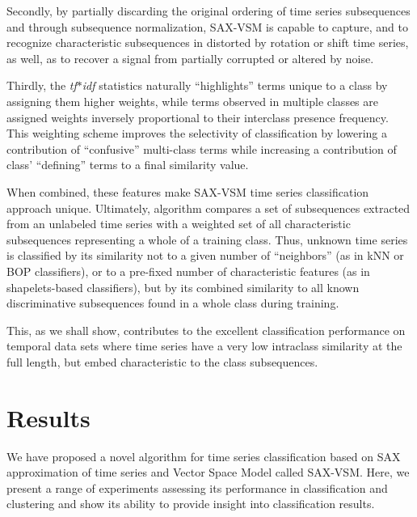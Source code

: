 Secondly, by partially discarding the original ordering of time series subsequences and
through subsequence normalization, SAX-VSM is capable to capture, and to recognize 
characteristic subsequences in distorted by rotation or shift time series, as well,
as to recover a signal from partially corrupted or altered by noise. 

Thirdly, the \textit{tf$\ast$idf} statistics naturally ``highlights'' terms unique to a
class by assigning them higher weights, while terms observed in multiple classes are 
assigned weights inversely proportional to their interclass presence frequency. 
This weighting scheme improves the selectivity of classification by  lowering a 
contribution of ``confusive'' multi-class terms while increasing a contribution 
of  class' ``defining'' terms to a final similarity value.   

When combined, these features make SAX-VSM time series classification approach 
unique. 
Ultimately, algorithm compares a set of subsequences extracted from an unlabeled time series 
with a weighted set of all characteristic subsequences representing a whole of a training class. 
Thus, unknown time series is classified by its similarity not to a given number of ``neighbors'' 
(as in kNN or BOP classifiers), or to a pre-fixed number of characteristic features (as in
shapelets-based classifiers), but by its combined similarity to all known discriminative
subsequences found in a whole class during training.

This, as we shall show, contributes to the excellent classification performance on temporal 
data sets where time series have a very low intraclass similarity at the full length, but 
embed characteristic to the class subsequences. 

\section{Results} \label{results}
We have proposed a novel algorithm for time series classification based on SAX
approximation of time series and Vector Space Model called SAX-VSM. Here, we present 
a range of experiments assessing its performance in classification and clustering and show
its ability to provide insight into classification results.

